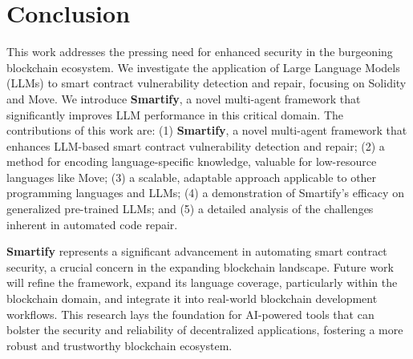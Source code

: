 \section{Conclusion}

This work addresses the pressing need for enhanced security in the burgeoning blockchain ecosystem. We investigate the application of Large Language Models (LLMs) to smart contract vulnerability detection and repair, focusing on Solidity and Move. We introduce \textbf{Smartify}, a novel multi-agent framework that significantly improves LLM performance in this critical domain. The contributions of this work are: (1) \textbf{Smartify}, a novel multi-agent framework that enhances LLM-based smart contract vulnerability detection and repair; (2) a method for encoding language-specific knowledge, valuable for low-resource languages like Move; (3) a scalable, adaptable approach applicable to other programming languages and LLMs; (4) a demonstration of Smartify’s efficacy on generalized pre-trained LLMs; and (5) a detailed analysis of the challenges inherent in automated code repair.

\textbf{Smartify} represents a significant advancement in automating smart contract security, a crucial concern in the expanding blockchain landscape. Future work will refine the framework, expand its language coverage, particularly within the blockchain domain, and integrate it into real-world blockchain development workflows. This research lays the foundation for AI-powered tools that can bolster the security and reliability of decentralized applications, fostering a more robust and trustworthy blockchain ecosystem.